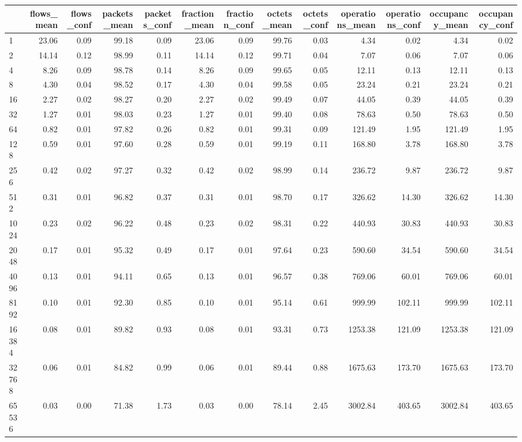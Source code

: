 \begin{tabular}{lrrrrrrrrrrrr}
\toprule
 & flows_mean & flows_conf & packets_mean & packets_conf & fraction_mean & fraction_conf & octets_mean & octets_conf & operations_mean & operations_conf & occupancy_mean & occupancy_conf \\
\midrule
1 & 23.06 & 0.09 & 99.18 & 0.09 & 23.06 & 0.09 & 99.76 & 0.03 & 4.34 & 0.02 & 4.34 & 0.02 \\
2 & 14.14 & 0.12 & 98.99 & 0.11 & 14.14 & 0.12 & 99.71 & 0.04 & 7.07 & 0.06 & 7.07 & 0.06 \\
4 & 8.26 & 0.09 & 98.78 & 0.14 & 8.26 & 0.09 & 99.65 & 0.05 & 12.11 & 0.13 & 12.11 & 0.13 \\
8 & 4.30 & 0.04 & 98.52 & 0.17 & 4.30 & 0.04 & 99.58 & 0.05 & 23.24 & 0.21 & 23.24 & 0.21 \\
16 & 2.27 & 0.02 & 98.27 & 0.20 & 2.27 & 0.02 & 99.49 & 0.07 & 44.05 & 0.39 & 44.05 & 0.39 \\
32 & 1.27 & 0.01 & 98.03 & 0.23 & 1.27 & 0.01 & 99.40 & 0.08 & 78.63 & 0.50 & 78.63 & 0.50 \\
64 & 0.82 & 0.01 & 97.82 & 0.26 & 0.82 & 0.01 & 99.31 & 0.09 & 121.49 & 1.95 & 121.49 & 1.95 \\
128 & 0.59 & 0.01 & 97.60 & 0.28 & 0.59 & 0.01 & 99.19 & 0.11 & 168.80 & 3.78 & 168.80 & 3.78 \\
256 & 0.42 & 0.02 & 97.27 & 0.32 & 0.42 & 0.02 & 98.99 & 0.14 & 236.72 & 9.87 & 236.72 & 9.87 \\
512 & 0.31 & 0.01 & 96.82 & 0.37 & 0.31 & 0.01 & 98.70 & 0.17 & 326.62 & 14.30 & 326.62 & 14.30 \\
1024 & 0.23 & 0.02 & 96.22 & 0.48 & 0.23 & 0.02 & 98.31 & 0.22 & 440.93 & 30.83 & 440.93 & 30.83 \\
2048 & 0.17 & 0.01 & 95.32 & 0.49 & 0.17 & 0.01 & 97.64 & 0.23 & 590.60 & 34.54 & 590.60 & 34.54 \\
4096 & 0.13 & 0.01 & 94.11 & 0.65 & 0.13 & 0.01 & 96.57 & 0.38 & 769.06 & 60.01 & 769.06 & 60.01 \\
8192 & 0.10 & 0.01 & 92.30 & 0.85 & 0.10 & 0.01 & 95.14 & 0.61 & 999.99 & 102.11 & 999.99 & 102.11 \\
16384 & 0.08 & 0.01 & 89.82 & 0.93 & 0.08 & 0.01 & 93.31 & 0.73 & 1253.38 & 121.09 & 1253.38 & 121.09 \\
32768 & 0.06 & 0.01 & 84.82 & 0.99 & 0.06 & 0.01 & 89.44 & 0.88 & 1675.63 & 173.70 & 1675.63 & 173.70 \\
65536 & 0.03 & 0.00 & 71.38 & 1.73 & 0.03 & 0.00 & 78.14 & 2.45 & 3002.84 & 403.65 & 3002.84 & 403.65 \\

\end{tabular}
